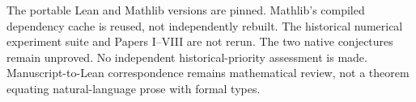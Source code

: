 The portable Lean and Mathlib versions are pinned. Mathlib's compiled dependency cache is reused, not independently rebuilt. The historical numerical experiment suite and Papers I--VIII are not rerun. The two native conjectures remain unproved. No independent historical-priority assessment is made. Manuscript-to-Lean correspondence remains mathematical review, not a theorem equating natural-language prose with formal types.
